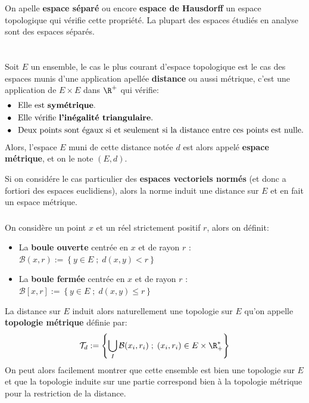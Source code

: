 On apelle \textbf{espace séparé} ou encore \textbf{espace de Hausdorff} un espace topologique qui vérifie cette propriété. La plupart des espaces étudiés en analyse sont des espaces séparés.

\chapter*{}
Soit \(E\) un ensemble, le cas le plus courant d'espace topologique est le cas des espaces munis d'une application apellée \textbf{distance} ou aussi métrique, c'est une application de \(E \times E\) dans \(\R^+\) qui vérifie:
\begin{align*}
   &\bullet \;\; \text{Elle est \textbf{symétrique}.} \\
   &\bullet \;\; \text{Elle vérifie \textbf{l'inégalité triangulaire}.} \\
   &\bullet \;\; \text{Deux points sont égaux si et seulement si la distance entre ces points est nulle.}
\end{align*}
Alors, l'espace \(E\) muni de cette distance notée \(d\) est alors appelé \textbf{espace métrique}, et on le note \((E, d)\).\<

Si on considére le cas particulier des \textbf{espaces vectoriels normés} (et donc a fortiori des espaces euclidiens), alors la norme induit une distance sur \(E\) et en fait un espace métrique.

\subsection*{}
On considère un point \(x\) et un réel strictement positif \(r\), alors on définit:
\begin{itemize}
   \item La \textbf{boule ouverte} centrée en  \(x\) et de rayon \(r\) : \(\mathcal{B}(x, r) := \left\{ y \in E \; ; \; d(x, y) < r\right\}\)
   \item La \textbf{boule fermée} centrée en  \(x\) et de rayon \(r\) : \(\mathcal{B}[x, r] := \left\{ y \in E \; ; \; d(x, y) \leq r\right\}\)
\end{itemize}
La distance sur \(E\) induit alors naturellement une topologie sur \(E\) qu'on appelle \textbf{topologie métrique} définie par:
\[
   \mathcal{T}_{d} := \left\{ \bigcup_I \mathcal{B}(x_i, r_i) \; ; \; (x_i, r_i) \in E \times \R_+^* \right\} 
\]
On peut alors facilement montrer que cette ensemble est bien une topologie sur \(E\) et que la topologie induite sur une partie correspond bien à la topologie métrique pour la restriction de la distance.

